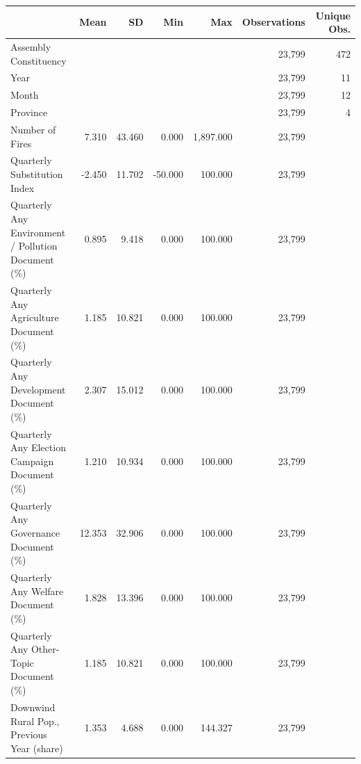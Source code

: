 \begin{tabular}{lrrrrrr}
\toprule
 & Mean & SD & Min & Max & Observations & Unique Obs.\\
\midrule
Assembly Constituency &  &  &  &  & 23,799 & 472\\
Year &  &  &  &  & 23,799 & 11\\
Month &  &  &  &  & 23,799 & 12\\
Province &  &  &  &  & 23,799 & 4\\
Number of Fires & 7.310 & 43.460 & 0.000 & 1,897.000 & 23,799 & \\
Quarterly Substitution Index & -2.450 & 11.702 & -50.000 & 100.000 & 23,799 & \\
Quarterly Any Environment / Pollution Document (\%) & 0.895 & 9.418 & 0.000 & 100.000 & 23,799 & \\
Quarterly Any Agriculture Document (\%) & 1.185 & 10.821 & 0.000 & 100.000 & 23,799 & \\
Quarterly Any Development Document (\%) & 2.307 & 15.012 & 0.000 & 100.000 & 23,799 & \\
Quarterly Any Election Campaign Document (\%) & 1.210 & 10.934 & 0.000 & 100.000 & 23,799 & \\
Quarterly Any Governance Document (\%) & 12.353 & 32.906 & 0.000 & 100.000 & 23,799 & \\
Quarterly Any Welfare Document (\%) & 1.828 & 13.396 & 0.000 & 100.000 & 23,799 & \\
Quarterly Any Other-Topic Document (\%) & 1.185 & 10.821 & 0.000 & 100.000 & 23,799 & \\
Downwind Rural Pop., Previous Year (share) & 1.353 & 4.688 & 0.000 & 144.327 & 23,799 & \\
\bottomrule
\end{tabular}
